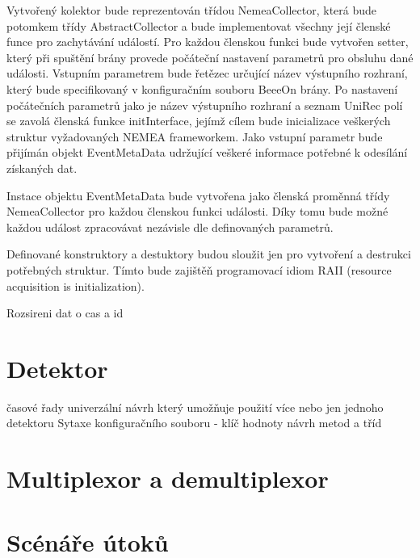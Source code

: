  Vytvořený kolektor bude reprezentován třídou NemeaCollector, která bude potomkem třídy
 AbstractCollector a bude implementovat všechny její členské funce pro zachytávání událostí. Pro každou 
 členskou funkci  bude vytvořen setter, který při spuštění brány provede počáteční nastavení
 parametrů pro obsluhu dané 
 události. Vstupním parametrem bude řetězec určující název výstupního rozhraní, který bude
 specifikovaný v 
 konfiguračním souboru BeeeOn brány. Po nastavení počátečních parametrů jako je název výstupního
 rozhraní a seznam UniRec polí se zavolá členská funkce initInterface, jejímž cílem bude inicializace
 veškerých struktur vyžadovaných NEMEA frameworkem.
 Jako vstupní parametr bude přijímán objekt EventMetaData udržující veškeré informace potřebné 
 k odesílání získaných dat.
 
 Instace objektu EventMetaData bude vytvořena jako členská proměnná třídy NemeaCollector
 pro každou členskou funkci události. Díky tomu bude možné každou událost zpracovávat nezávisle dle
 definovaných parametrů.
 
 Definované konstruktory a destuktory budou sloužit jen pro vytvoření a destrukci potřebných 
 struktur. Tímto bude zajištěň programovací idiom RAII (resource acquisition is initialization).
 
 Rozsireni dat o cas a id
    
 \section{Detektor}
  časové řady
  univerzální návrh který umožňuje použití více nebo jen jednoho detektoru
  Sytaxe konfiguračního souboru - klíč hodnoty
  návrh metod a tříd 
  
 \section{Multiplexor a demultiplexor}
 
 \section{Scénáře útoků}
